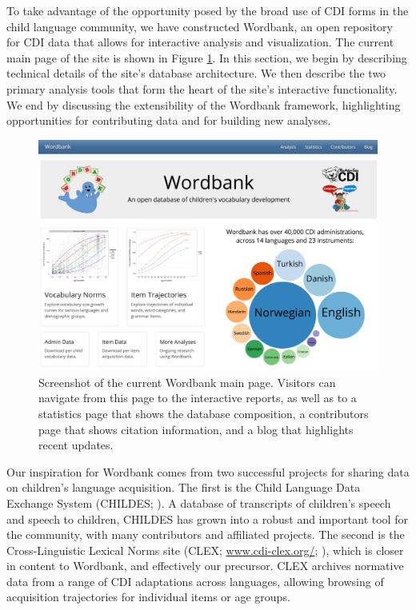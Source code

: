 \documentclass[man,noapacite]{apa}
\begin{document}
To take advantage of the opportunity posed by the broad use of CDI forms in the child language community, we have constructed Wordbank, an open repository for CDI data that allows for interactive analysis and visualization. The current main page of the site is shown in Figure \ref{fig:screenshot}. In this section, we begin by describing technical details of the site's database architecture. We then describe the two primary analysis tools that form the heart of the site's interactive functionality. We end by discussing the extensibility of the Wordbank framework, highlighting opportunities for contributing data and for building new analyses. 


\begin{figure}[h!]
\includegraphics[width=6.4in]{figures/screenshot.png}
\caption{\label{fig:screenshot} Screenshot of the current Wordbank main page. Visitors can navigate from this page to the interactive reports, as well as to a statistics page that shows the database composition, a contributors page that shows citation information, and a blog that highlights recent updates.}
\end{figure}

Our inspiration for Wordbank comes from two successful projects for sharing data on children's language acquisition. The first is the Child Language Data Exchange System (CHILDES; ). A database of transcripts of children's speech and speech to children, CHILDES has grown into a robust and important tool for the community, with many contributors and affiliated projects. The second is the Cross-Linguistic Lexical Norms site (CLEX; \url{www.cdi-clex.org/}; ), which is closer in content to Wordbank, and effectively our precursor. CLEX archives normative data from a range of CDI adaptations across languages, allowing browsing of acquisition trajectories for individual items or age groups. 
\end{document}
